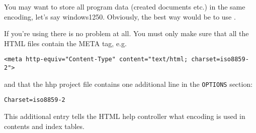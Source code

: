 
You may want to store all program data (created documents etc.) in
the same encoding, let's say windows1250. Obviously, the best way would
be to use .


If you're using  there is
no problem at all. You must only make sure that all the HTML files contain
the META tag, e.g.

\begin{verbatim}
<meta http-equiv="Content-Type" content="text/html; charset=iso8859-2">
\end{verbatim}

and that the hhp project file contains one additional line in the {\tt OPTIONS}
section:

\begin{verbatim}
Charset=iso8859-2
\end{verbatim}

This additional entry tells the HTML help controller what encoding is used
in contents and index tables.

